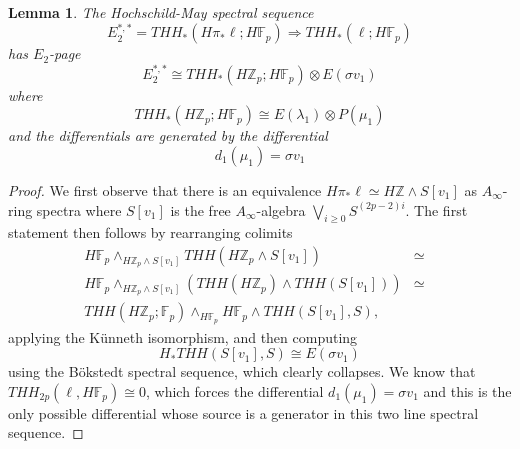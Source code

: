 \documentclass[12pt]{amsart}
\newcommand{\Z}{\mathbb{Z}}
\newcommand{\F}{\mathbb{F}}
\newtheorem{lem}[equation]{Lemma}
\theoremstyle{definition}
\numberwithin{equation}{section}
\numberwithin{figure}{section}
\begin{document}
\begin{lem}
The Hochschild-May spectral sequence 
\[ E_2^{*,*}=THH_*(H\pi_*\ell;H\F_p)\Rightarrow THH_*(\ell;H\F_p)\]
has $E_2$-page 
\[ E_2^{*,*}\cong THH_*(H\Z_p;H\F_p)\otimes E(\sigma v_1)\]
where 
\[ THH_*(H\Z_p;H\F_p)\cong E(\lambda_1)\otimes P(\mu_1)\]
and 
the differentials are generated by the differential 
\[ d_{1}(\mu_1)=\sigma v_1 \]
\end{lem}
\begin{proof}
We first observe that there is an equivalence $H\pi_*\ell\simeq H\Z\wedge S[v_1]$ as $A_{\infty}$-ring spectra where $S[v_1]$ is the free $A_{\infty}$-algebra $\bigvee_{i\ge 0} S^{(2p-2)i}$. The first statement then follows by rearranging colimits 
\[
	\begin{array}{rcl}
	H\F_p\wedge_{H\Z_p\wedge S[v_1]} THH(H\Z_p\wedge S[v_1])&\simeq &\\
	H\F_p\wedge_{H\Z_p\wedge S[v_1]} \left (THH(H\Z_p)\wedge THH(S[v_1]) \right )&\simeq  \\
	THH(H\Z_p;\F_p)\wedge_{H\F_p} H\F_p\wedge THH(S[v_1],S), & &
 	\end{array}
\]
applying the K\"unneth isomorphism, and then computing 
\[ H_*THH(S[v_1],S)\cong E(\sigma v_1)\]
using the B\"okstedt spectral sequence, which clearly collapses. 
We know that $THH_{2p}(\ell,H\F_p)\cong 0$, which forces the differential $d_{1}(\mu_1)=\sigma v_1$ and this is the only possible differential whose source is a generator in this two line spectral sequence. 
\end{proof}
\end{document}
